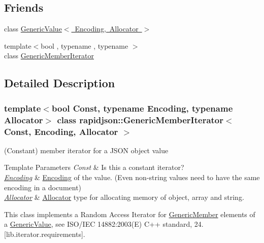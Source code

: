\subsection*{Friends}
\begin{DoxyCompactItemize}
\item 
class \mbox{\hyperlink{classrapidjson_1_1_generic_member_iterator_a82bdd5798f1a5ac0e3e7ba4bd6938cfc}{Generic\+Value$<$ Encoding, Allocator $>$}}
\item 
{\footnotesize template$<$bool , typename , typename $>$ }\\class \mbox{\hyperlink{classrapidjson_1_1_generic_member_iterator_aa375aeb1ffac85cddc3a72a6c24ec6e1}{Generic\+Member\+Iterator}}
\end{DoxyCompactItemize}


\subsection{Detailed Description}
\subsubsection*{template$<$bool Const, typename Encoding, typename Allocator$>$\newline
class rapidjson\+::\+Generic\+Member\+Iterator$<$ Const, Encoding, Allocator $>$}

(Constant) member iterator for a J\+S\+ON object value 


\begin{DoxyTemplParams}{Template Parameters}
{\em Const} & Is this a constant iterator? \\
\hline
{\em \mbox{\hyperlink{classrapidjson_1_1_encoding}{Encoding}}} & \mbox{\hyperlink{classrapidjson_1_1_encoding}{Encoding}} of the value. (Even non-\/string values need to have the same encoding in a document) \\
\hline
{\em \mbox{\hyperlink{classrapidjson_1_1_allocator}{Allocator}}} & \mbox{\hyperlink{classrapidjson_1_1_allocator}{Allocator}} type for allocating memory of object, array and string.\\
\hline
\end{DoxyTemplParams}
This class implements a Random Access Iterator for \mbox{\hyperlink{structrapidjson_1_1_generic_member}{Generic\+Member}} elements of a \mbox{\hyperlink{classrapidjson_1_1_generic_value}{Generic\+Value}}, see I\+S\+O/\+I\+EC 14882\+:2003(E) C++ standard, 24. \mbox{[}lib.\+iterator.\+requirements\mbox{]}.

